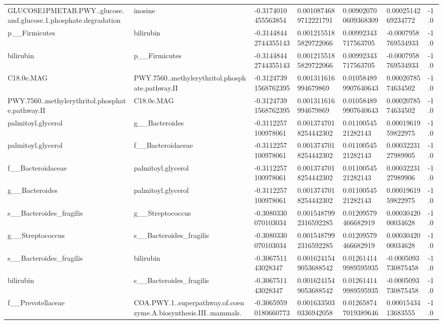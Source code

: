 \begin{longtable}{lllllll}
GLUCOSE1PMETAB.PWY..glucose.and.glucose.1.phosphate.degradation & inosine & -0.3174010455563854 & 0.0010874689712221791 & 0.009020700609368309 & 0.0002514269234772 & -1.0 \\
p\_\_Firmicutes & bilirubin & -0.31448442744355143 & 0.0012155185829722066 & 0.00992343717563705 & -0.0007958769534933 & -1.0 \\
bilirubin & p\_\_Firmicutes & -0.31448442744355143 & 0.0012155185829722066 & 0.00992343717563705 & -0.0007958769534933 & -1.0 \\
C18.0e.MAG & PWY.7560..methylerythritol.phosphate.pathway.II & -0.31247391568762395 & 0.001311616994679869 & 0.010584899907640643 & 0.0002078574634502 & -1.0 \\
PWY.7560..methylerythritol.phosphate.pathway.II & C18.0e.MAG & -0.31247391568762395 & 0.001311616994679869 & 0.010584899907640643 & 0.0002078574634502 & -1.0 \\
palmitoyl.glycerol & g\_\_Bacteroides & -0.3112257100978061 & 0.0013747018254442302 & 0.0110054521282143 & 0.0001961959822975 & -1.0 \\
palmitoyl.glycerol & f\_\_Bacteroidaceae & -0.3112257100978061 & 0.0013747018254442302 & 0.0110054521282143 & 0.0003223127989905 & -1.0 \\
f\_\_Bacteroidaceae & palmitoyl.glycerol & -0.3112257100978061 & 0.0013747018254442302 & 0.0110054521282143 & 0.0003223127989906 & -1.0 \\
g\_\_Bacteroides & palmitoyl.glycerol & -0.3112257100978061 & 0.0013747018254442302 & 0.0110054521282143 & 0.0001961959822975 & -1.0 \\
s\_\_Bacteroides\_fragilis & g\_\_Streptococcus & -0.3080330070103034 & 0.0015487992316592285 & 0.01209579466682919 & 0.0003042000034628 & -1.0 \\
g\_\_Streptococcus & s\_\_Bacteroides\_fragilis & -0.3080330070103034 & 0.0015487992316592285 & 0.01209579466682919 & 0.0003042000034628 & -1.0 \\
s\_\_Bacteroides\_fragilis & bilirubin & -0.306751143028347 & 0.0016241549053688542 & 0.012614149989595935 & -0.0005093730875458 & -1.0 \\
bilirubin & s\_\_Bacteroides\_fragilis & -0.306751143028347 & 0.0016241549053688542 & 0.012614149989595935 & -0.0005093730875458 & -1.0 \\
f\_\_Prevotellaceae & COA.PWY.1..superpathway.of.coenzyme.A.biosynthesis.III..mammals. & -0.30659590180660773 & 0.0016335030336942058 & 0.012658747019389646 & 0.0001543413683555 & -1.0 \\

\end{longtable}
